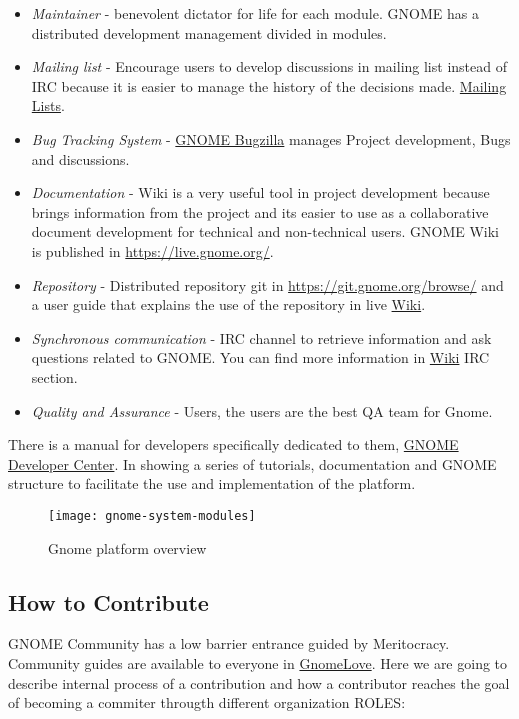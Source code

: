 \begin{itemize}
	\item \textit{Maintainer} - benevolent dictator for life for each module. GNOME has a distributed development management divided in modules.
	\item \textit{Mailing list} - Encourage users to develop discussions in mailing list instead of IRC because it is easier to manage the history of the decisions made. \href{https://mail.gnome.org/mailman/listinfo}{Mailing Lists}.
	\item \textit{Bug Tracking System} - \href{https://bugzilla.gnome.org/}{GNOME Bugzilla} manages Project development, Bugs and discussions.
	\item \textit{Documentation} - Wiki is a very useful tool in project development because brings information from the project and its easier to use as a collaborative document development for technical and non-technical users. GNOME Wiki is published in \url{https://live.gnome.org/}.
	\item \textit{Repository} - Distributed repository git in \url{https://git.gnome.org/browse/} and a user guide that explains the use of the repository in live \href{https://live.gnome.org/Git}{Wiki}.
	\item \textit{Synchronous communication} - IRC channel to retrieve information and ask questions related to GNOME. You can find more information in \href{https://live.gnome.org/GnomeIrcChannels}{Wiki} IRC section.
	\item \textit{Quality and Assurance} - Users, the users are the best QA team for Gnome.
\end{itemize} There is a manual for developers specifically dedicated to them, \href{https://developer.gnome.org/}{GNOME Developer Center}. In showing a series of tutorials, documentation and GNOME structure to facilitate the use and implementation of the platform.

\begin{figure}[H]
    \centering
    \texttt{[image: gnome-system-modules]}
    \caption{Gnome platform overview}
    \label{platform}
\end{figure}

\subsection{How to Contribute}

\par GNOME Community has a low barrier entrance guided by Meritocracy. Community guides are available to everyone in \href{https://live.gnome.org/GnomeLove}{GnomeLove}. Here we are going to describe internal process of a contribution and how a contributor reaches the goal of becoming a commiter througth different organization ROLES:

